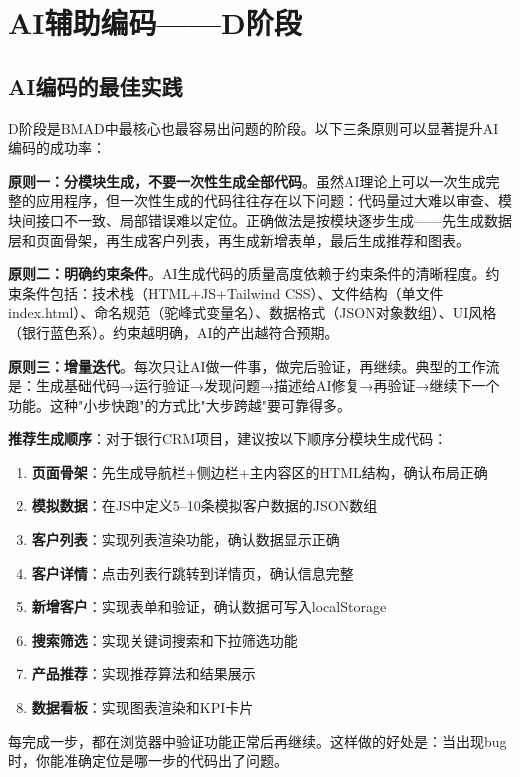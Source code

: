 \section{AI辅助编码——D阶段}

\subsection{AI编码的最佳实践}

D阶段是BMAD中最核心也最容易出问题的阶段。以下三条原则可以显著提升AI编码的成功率：

\textbf{原则一：分模块生成，不要一次性生成全部代码}。虽然AI理论上可以一次生成完整的应用程序，但一次性生成的代码往往存在以下问题：代码量过大难以审查、模块间接口不一致、局部错误难以定位。正确做法是按模块逐步生成——先生成数据层和页面骨架，再生成客户列表，再生成新增表单，最后生成推荐和图表。

\textbf{原则二：明确约束条件}。AI生成代码的质量高度依赖于约束条件的清晰程度。约束条件包括：技术栈（HTML+JS+Tailwind CSS）、文件结构（单文件index.html）、命名规范（驼峰式变量名）、数据格式（JSON对象数组）、UI风格（银行蓝色系）。约束越明确，AI的产出越符合预期。

\textbf{原则三：增量迭代}。每次只让AI做一件事，做完后验证，再继续。典型的工作流是：生成基础代码→运行验证→发现问题→描述给AI修复→再验证→继续下一个功能。这种"小步快跑"的方式比"大步跨越"要可靠得多。\par

\textbf{推荐生成顺序}：对于银行CRM项目，建议按以下顺序分模块生成代码：
\begin{enumerate}[leftmargin=2em]
  \item \textbf{页面骨架}：先生成导航栏+侧边栏+主内容区的HTML结构，确认布局正确
  \item \textbf{模拟数据}：在JS中定义5--10条模拟客户数据的JSON数组
  \item \textbf{客户列表}：实现列表渲染功能，确认数据显示正确
  \item \textbf{客户详情}：点击列表行跳转到详情页，确认信息完整
  \item \textbf{新增客户}：实现表单和验证，确认数据可写入localStorage
  \item \textbf{搜索筛选}：实现关键词搜索和下拉筛选功能
  \item \textbf{产品推荐}：实现推荐算法和结果展示
  \item \textbf{数据看板}：实现图表渲染和KPI卡片
\end{enumerate}
每完成一步，都在浏览器中验证功能正常后再继续。这样做的好处是：当出现bug时，你能准确定位是哪一步的代码出了问题。

